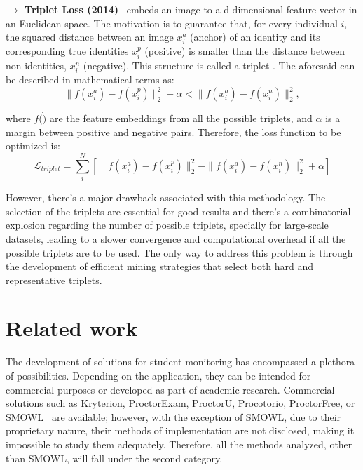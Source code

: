 \documentclass[class=report, crop=false, a4paper, 12pt]{standalone}
\begin{document}
\vspace{0.7\baselineskip}
\noindent\textbf{$\rightarrow$ Triplet Loss (2014)}~\autocite{schroffFaceNetUnifiedEmbedding2015} embeds an image to a d-dimensional feature vector in an Euclidean space. The motivation is to guarantee that, for every individual $i$, the squared distance between an image $x^{a}_{i}$ (anchor) of an identity and its corresponding true identities $x^{p}_{i}$ (positive) is smaller than the distance between non-identities, $x^{n}_{i}$ (negative). This structure is called a triplet . The aforesaid can be described in mathematical terms as:
\begin{equation}
\|f(x^{a}_{i})-f(x^{p}_{i})\|^{2}_{2} + \alpha < \|f(x^{a}_{i})-f(x^{n}_{i})\|^{2}_{2},
\end{equation}

\noindent where $f(\dot)$ are the feature embeddings from all the possible triplets, and $\alpha$ is a margin between positive and negative pairs. Therefore, the loss function to be optimized is:
\begin{equation}
\mathcal{L}_{triplet} = \sum_{i}^{N}\left[\|f(x^{a}_{i})-f(x^{p}_{i})\|^{2}_{2}-\|f(x^{a}_{i})-f(x^{n}_{i})\|^{2}_{2}+\alpha\right]
\end{equation}

However, there's a major drawback associated with this methodology. The selection of the triplets are essential for good results and there's a combinatorial explosion regarding the number of possible triplets, specially for large-scale datasets, leading to a slower convergence and computational overhead if all the possible triplets are to be used. The only way to address this problem is through the development of efficient mining strategies that select both hard and representative triplets.

\section{Related work}
\label{sec:related_work}
The development of solutions for student monitoring has encompassed a plethora of possibilities. Depending on the application, they can be intended for commercial purposes or developed as part of academic research. Commercial solutions such as Kryterion, ProctorExam, ProctorU, Procotorio, ProctorFree, or SMOWL~\autocite{labayenOnlineStudentAuthentication2021} are available; however, with the exception of SMOWL, due to their proprietary nature, their methods of implementation are not disclosed, making it impossible to study them adequately. Therefore, all the methods analyzed, other than SMOWL, will fall under the second category.
\end{document}
